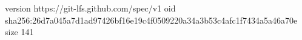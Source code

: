 version https://git-lfs.github.com/spec/v1
oid sha256:26d7a045a7d1ad97426bf16e19c4f0509220a34a3b53c4afc1f7434a5a46a70e
size 141
